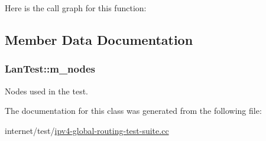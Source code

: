 Here is the call graph for this function\+:




\subsection{Member Data Documentation}
\subsubsection[{\texorpdfstring{m\+\_\+nodes}{m_nodes}}]{ Lan\+Test\+::m\+\_\+nodes\hspace{0.3cm}{\ttfamily [private]}}\hypertarget{classLanTest_aa89c8886b5180249409317603fe09577}{}\label{classLanTest_aa89c8886b5180249409317603fe09577}


Nodes used in the test. 



The documentation for this class was generated from the following file\+:\begin{DoxyCompactItemize}
\item 
internet/test/\hyperlink{ipv4-global-routing-test-suite_8cc}{ipv4-\/global-\/routing-\/test-\/suite.\+cc}\end{DoxyCompactItemize}
